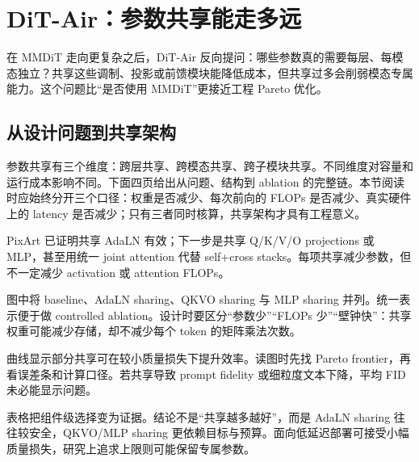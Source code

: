 \section{DiT-Air：参数共享能走多远}

在 MMDiT 走向更复杂之后，DiT-Air 反向提问：哪些参数真的需要每层、每模态独立？共享这些调制、投影或前馈模块能降低成本，但共享过多会削弱模态专属能力。这个问题比“是否使用 MMDiT”更接近工程 Pareto 优化。

\subsection{从设计问题到共享架构}

参数共享有三个维度：跨层共享、跨模态共享、跨子模块共享。不同维度对容量和运行成本影响不同。下面四页给出从问题、结构到 ablation 的完整链。本节阅读时应始终分开三个口径：权重是否减少、每次前向的 FLOPs 是否减少、真实硬件上的 latency 是否减少；只有三者同时核算，共享架构才具有工程意义。


PixArt 已证明共享 AdaLN 有效；下一步是共享 Q/K/V/O projections 或 MLP，甚至用统一 joint attention 代替 self+cross stacks。每项共享减少参数，但不一定减少 activation 或 attention FLOPs。


图中将 baseline、AdaLN sharing、QKVO sharing 与 MLP sharing 并列。统一表示便于做 controlled ablation。设计时要区分“参数少”“FLOPs 少”“壁钟快”：共享权重可能减少存储，却不减少每个 token 的矩阵乘法次数。


曲线显示部分共享可在较小质量损失下提升效率。读图时先找 Pareto frontier，再看误差条和计算口径。若共享导致 prompt fidelity 或细粒度文本下降，平均 FID 未必能显示问题。


表格把组件级选择变为证据。结论不是“共享越多越好”，而是 AdaLN sharing 往往较安全，QKVO/MLP sharing 更依赖目标与预算。面向低延迟部署可接受小幅质量损失，研究上追求上限则可能保留专属参数。


